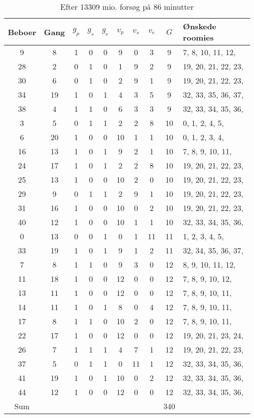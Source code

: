 \documentclass[article,oneside,11pt,a4paper]{memoir}
\newenvironment{assignment}[1]{
\begin{table}[h]
\caption{#1}
\footnotesize
\begin{center}
\begin{tabular}{cccccccccl}
\toprule
Beboer & Gang & $g_p$ & $g_s$ & $g_e$ & $v_p$ & $v_s$ & $v_e$ & $G$ & Ønskede roomies \\ \midrule
}{
\bottomrule
\end{tabular}
\end{center}
\end{table}

}
\begin{document}
\begin{assignment}{Efter 13309 mio. forsøg på 86 minutter}
     9 &    8 &   1 &   0 &   0 &   9 &   0 &   3 &  9 &   7,  8, 10, 11, 12, \\
    28 &    2 &   0 &   1 &   0 &   1 &   9 &   2 &  9 &  19, 20, 21, 22, 23, \\
    30 &    6 &   0 &   1 &   0 &   2 &   9 &   1 &  9 &  19, 20, 21, 22, 23, \\
    34 &   19 &   1 &   0 &   1 &   4 &   3 &   5 &  9 &  32, 33, 35, 36, 37, \\
    38 &    4 &   1 &   1 &   0 &   6 &   3 &   3 &  9 &  32, 33, 34, 35, 36, \\
     3 &    5 &   0 &   1 &   1 &   2 &   2 &   8 & 10 &   0,  1,  2,  4,  5, \\
     6 &   20 &   1 &   0 &   0 &  10 &   1 &   1 & 10 &   0,  1,  2,  3,  4, \\
    16 &   13 &   1 &   0 &   1 &   9 &   2 &   1 & 10 &   7,  8,  9, 10, 11, \\
    24 &   17 &   1 &   0 &   1 &   2 &   2 &   8 & 10 &  19, 20, 21, 22, 23, \\
    25 &   13 &   1 &   0 &   0 &  10 &   2 &   0 & 10 &  19, 20, 21, 22, 23, \\
    29 &    9 &   0 &   1 &   1 &   2 &   9 &   1 & 10 &  19, 20, 21, 22, 23, \\
    31 &   16 &   1 &   0 &   0 &  10 &   0 &   2 & 10 &  19, 20, 21, 22, 23, \\
    40 &   12 &   1 &   0 &   0 &  10 &   1 &   1 & 10 &  32, 33, 34, 35, 36, \\
     0 &   13 &   0 &   0 &   1 &   0 &   1 &  11 & 11 &   1,  2,  3,  4,  5, \\
    33 &   19 &   1 &   0 &   1 &   9 &   1 &   2 & 11 &  32, 34, 35, 36, 37, \\
     7 &    8 &   1 &   1 &   0 &   9 &   3 &   0 & 12 &   8,  9, 10, 11, 12, \\
    11 &   18 &   1 &   0 &   0 &  12 &   0 &   0 & 12 &   7,  8,  9, 10, 12, \\
    13 &   11 &   1 &   0 &   0 &  12 &   0 &   0 & 12 &   7,  8,  9, 10, 11, \\
    14 &   11 &   1 &   0 &   1 &   8 &   0 &   4 & 12 &   7,  8,  9, 10, 11, \\
    17 &    8 &   1 &   1 &   0 &  10 &   2 &   0 & 12 &   7,  8,  9, 10, 11, \\
    22 &   17 &   1 &   0 &   0 &  12 &   0 &   0 & 12 &  19, 20, 21, 23, 24, \\
    26 &    7 &   1 &   1 &   1 &   4 &   7 &   1 & 12 &  19, 20, 21, 22, 23, \\
    37 &    5 &   0 &   1 &   1 &   0 &  11 &   1 & 12 &  32, 33, 34, 35, 36, \\
    41 &   19 &   1 &   0 &   1 &  10 &   0 &   2 & 12 &  32, 33, 34, 35, 36, \\
    44 &   12 &   1 &   0 &   0 &  12 &   0 &   0 & 12 &  32, 33, 34, 35, 36, \\
Sum &&&&&&&& 340 & \\
\end{assignment}
\end{document}
